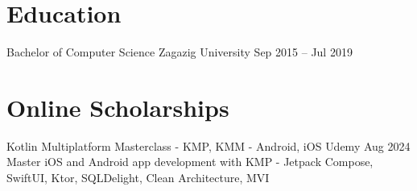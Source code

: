 \documentclass[A4paper, 11pt]{article}
\begin{document}






\section{Education}
  \tripleHeader
    {Bachelor of Computer Science}
    {Zagazig University}
    {Sep 2015 – Jul 2019}


\section{Online Scholarships}

\project
    {Kotlin Multiplatform Masterclass - KMP, KMM - Android, iOS}
    {Udemy}
    {Aug 2024}
    {Master iOS and Android app development with KMP - Jetpack Compose, SwiftUI, Ktor, SQLDelight, Clean Architecture, MVI}
\end{document}
